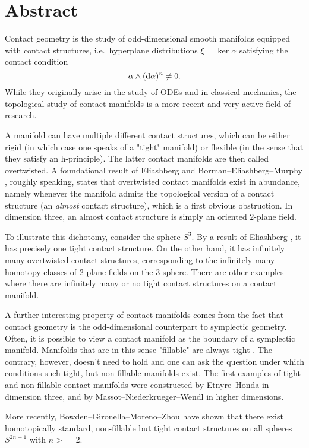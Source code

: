 \section*{Abstract}
Contact geometry is the study of odd-dimensional smooth manifolds equipped with contact structures, i.e.\ hyperplane distributions $\xi = \ker \alpha$ satisfying the contact condition
\[
    \alpha \wedge (\mathrm{d} \alpha)^n \neq 0.
\]
While they originally arise in the study of ODEs and in classical mechanics, the topological study of contact manifolds is a more recent and very active field of research.

A manifold can have multiple different contact structures, which can be either rigid (in which case one speaks of a "tight" manifold) or flexible (in the sense that they satisfy an h-principle). The latter contact manifolds are then called overtwisted. A foundational result of Eliashberg \cite{Eliashberg89} and Borman--Eliashberg--Murphy \cite{BEM15}, roughly speaking, states that overtwisted contact manifolds exist in abundance, namely whenever the manifold admits the topological version of a contact structure (an \emph{almost} contact structure), which is a first obvious obstruction. In dimension three, an almost contact structure is simply an oriented $2$-plane field. 


To illustrate this dichotomy, consider the sphere $S^3$. By a result of Eliashberg \cite{Eliashberg92}, it has precisely one tight contact structure. On the other hand, it has infinitely many overtwisted contact structures, corresponding to the infinitely many homotopy classes of 2-plane fields on the 3-sphere. There are other examples where there are infinitely many or no tight contact structures on a contact manifold.

A further interesting property of contact manifolds comes from the fact that contact geometry is the odd-dimensional counterpart to symplectic geometry. Often, it is possible to view a contact manifold as the boundary of a symplectic manifold. Manifolds that are in this sense "fillable" are always tight \cite{Gromov85,Eliashberg91}. The contrary, however, doesn't need to hold and one can ask the question under which conditions such tight, but non-fillable manifolds exist. The first examples of tight and non-fillable contact manifolds were constructed by Etnyre--Honda \cite{EH02} in dimension three, and by Massot--Niederkrueger--Wendl \cite{MNW13} in higher dimensions.


More recently, Bowden--Gironella--Moreno--Zhou \cite{BGMZ22} have shown that there exist homotopically standard, non-fillable but tight contact structures on all spheres $S^{2n+1}$ with $n >= 2$. 

